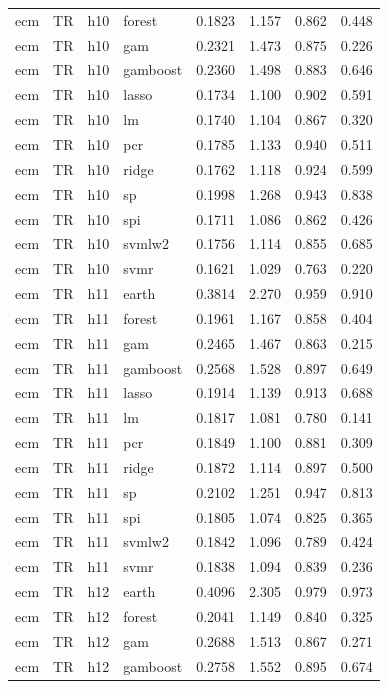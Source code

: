 \begin{ThreePartTable}
\begin{longtable}[t]{llclcccc}
ecm & TR & h10 & forest & 0.1823 & 1.157 & 0.862 & 0.448\\
ecm & TR & h10 & gam & 0.2321 & 1.473 & 0.875 & 0.226\\
ecm & TR & h10 & gamboost & 0.2360 & 1.498 & 0.883 & 0.646\\
ecm & TR & h10 & lasso & 0.1734 & 1.100 & 0.902 & 0.591\\
ecm & TR & h10 & lm & 0.1740 & 1.104 & 0.867 & 0.320\\
ecm & TR & h10 & pcr & 0.1785 & 1.133 & 0.940 & 0.511\\
ecm & TR & h10 & ridge & 0.1762 & 1.118 & 0.924 & 0.599\\
ecm & TR & h10 & sp & 0.1998 & 1.268 & 0.943 & 0.838\\
ecm & TR & h10 & spi & 0.1711 & 1.086 & 0.862 & 0.426\\
ecm & TR & h10 & svmlw2 & 0.1756 & 1.114 & 0.855 & 0.685\\
ecm & TR & h10 & svmr & 0.1621 & 1.029 & 0.763 & 0.220\\
\addlinespace
ecm & TR & h11 & earth & 0.3814 & 2.270 & 0.959 & 0.910\\
ecm & TR & h11 & forest & 0.1961 & 1.167 & 0.858 & 0.404\\
ecm & TR & h11 & gam & 0.2465 & 1.467 & 0.863 & 0.215\\
ecm & TR & h11 & gamboost & 0.2568 & 1.528 & 0.897 & 0.649\\
ecm & TR & h11 & lasso & 0.1914 & 1.139 & 0.913 & 0.688\\
ecm & TR & h11 & lm & 0.1817 & 1.081 & 0.780 & 0.141\\
ecm & TR & h11 & pcr & 0.1849 & 1.100 & 0.881 & 0.309\\
ecm & TR & h11 & ridge & 0.1872 & 1.114 & 0.897 & 0.500\\
ecm & TR & h11 & sp & 0.2102 & 1.251 & 0.947 & 0.813\\
ecm & TR & h11 & spi & 0.1805 & 1.074 & 0.825 & 0.365\\
ecm & TR & h11 & svmlw2 & 0.1842 & 1.096 & 0.789 & 0.424\\
ecm & TR & h11 & svmr & 0.1838 & 1.094 & 0.839 & 0.236\\
\addlinespace
ecm & TR & h12 & earth & 0.4096 & 2.305 & 0.979 & 0.973\\
ecm & TR & h12 & forest & 0.2041 & 1.149 & 0.840 & 0.325\\
ecm & TR & h12 & gam & 0.2688 & 1.513 & 0.867 & 0.271\\
ecm & TR & h12 & gamboost & 0.2758 & 1.552 & 0.895 & 0.674\\

\end{longtable}
\end{ThreePartTable}
